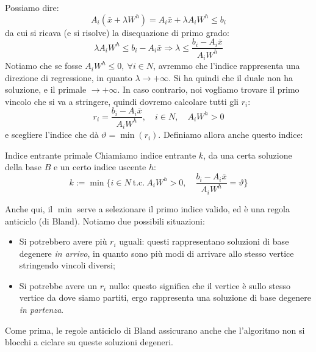 \documentclass[a4paper,11pt]{article}
\begin{document}
\begin{itemize}
Possiamo dire:
$$
A_i \left( \bar{x} + \lambda W^h \right) = A_i \bar{x} + \lambda A_i W^h \leq b_i
$$
da cui si ricava (e si risolve) la disequazione di primo grado:
$$
\lambda A_i W^h \leq b_i - A_i \bar{x} \Rightarrow \lambda \leq \frac{b_i - A_i \bar{x}}{A_i W^h}
$$
Notiamo che se fosse $A_i W^h \leq 0, \ \forall i \in N$, avremmo che l'indice rappresenta una direzione di regressione, in quanto $\lambda \rightarrow +\infty$.
Si ha quindi che il duale non ha soluzione, e il primale $\rightarrow +\infty$.
In caso contrario, noi vogliamo trovare il primo vincolo che si va a stringere, quindi dovremo calcolare tutti gli $r_i$:
$$
r_i = \frac{b_i - A_i \bar{x}}{A_i W^h}, \quad i \in N, \quad A_i W^h > 0
$$
e scegliere l'indice che dà $\vartheta = \min(r_i)$.
Definiamo allora anche questo indice:
\begin{definition}{Indice entrante primale}
	Chiamiamo indice entrante $k$, da una certa soluzione della base $B$ e un certo indice uscente $h$:
	$$
	k := \min\{ i \in N \ \text{t.c.} \ A_i W^h > 0, \quad \frac{b_i - A_i \bar{x}}{A_i W^h} = \vartheta \}	
	$$
\end{definition}
Anche qui, il $\min$ serve a selezionare il primo indice valido, ed è una regola anticiclo (di Bland).
Notiamo due possibili situazioni:
\begin{itemize}
	\item Si potrebbero avere più $r_i$ uguali: questi rappresentano soluzioni di base degenere \textit{in arrivo}, in quanto sono più modi di arrivare allo stesso vertice stringendo vincoli diversi;
	\item Si potrebbe avere un $r_i$ nullo: questo significa che il vertice è sullo stesso vertice da dove siamo partiti, ergo rappresenta una soluzione di base degenere \textit{in partenza}.
\end{itemize}
Come prima, le regole anticiclo di Bland assicurano anche che l'algoritmo non si blocchi a ciclare su queste soluzioni degeneri.
\end{itemize}
\end{document}
